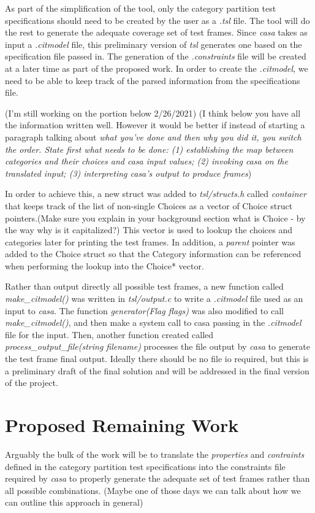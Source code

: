 \documentclass[a4full,12pt]{article}
\newcommand{\eas}[1]{{\color{blue}\sf ({#1})}}
\newcommand{\ag}[1]{{\color{red}\sf ({#1})}}
\begin{document}
As part of the simplification of the tool, only the category partition test specifications
  should need to be created by the user as a \emph{.tsl} file. The tool will do the rest to
  generate the adequate coverage set of test frames. Since \emph{casa} takes as input a 
  \emph{.citmodel} file, this preliminary version of \emph{tsl} generates one based on the
  specification file passed in. The generation of the \emph{.constraints} file will be created
  at a later time as part of the proposed work. In order to create the \emph{.citmodel}, we need
  to be able to keep track of the parsed information from the specifications file.
  
\ag{I'm still working on the portion below 2/26/2021}    
\eas{I think below you have all the information written well. However it would be better if instead of starting a paragraph
  talking about \em{what you've done} and then \em{why you did it}, you switch the order. State first what needs to be done:
  (1) establishing the map between categories and their choices and casa input values;
  (2) invoking casa on the translated input;
  (3) interpreting casa's output to produce frames}
  
In order to achieve this, a new struct was added to \emph{tsl/structs.h} called \emph{container} that
  keeps track of the list of non-single Choices as a vector of Choice struct
  pointers.\eas{Make sure you explain in your background section what is Choice - by the way why is it capitalized?} This vector is used to lookup the choices and categories later for
  printing the test frames. In addition, a \emph{parent} pointer was added to
  the Choice struct so that the Category information can be referenced when
  performing the lookup into the Choice* vector.
  
Rather than output directly all possible test frames, a new function called
  \emph{make\_citmodel()} was written in \emph{tsl/output.c} to write a 
  \emph{.citmodel} file used as an input to \emph{casa}. The function
  \emph{generator(Flag flags)} was also modified to call \emph{make\_citmodel()},
  and then make a system call to casa passing in the \emph{.citmodel} file for
  the input. Then, another function created  called
  \emph{process\_output\_file(string filename)} processes the file output by
  \emph{casa} to generate the test frame final output. Ideally there should be
  no file io required, but this is a preliminary draft of the final solution
  and will be addressed in the final version of the project.
  
  \section{Proposed Remaining Work}
Arguably the bulk of the work will be to translate the \emph{properties} and 
  \emph{contraints} defined in the category partition test specifications into
  the constraints file required by \emph{casa} to properly generate the adequate
  set of test frames rather than all possible combinations. \eas{Maybe one of those days we can talk about how we can outline this approach in general}
\end{document}
